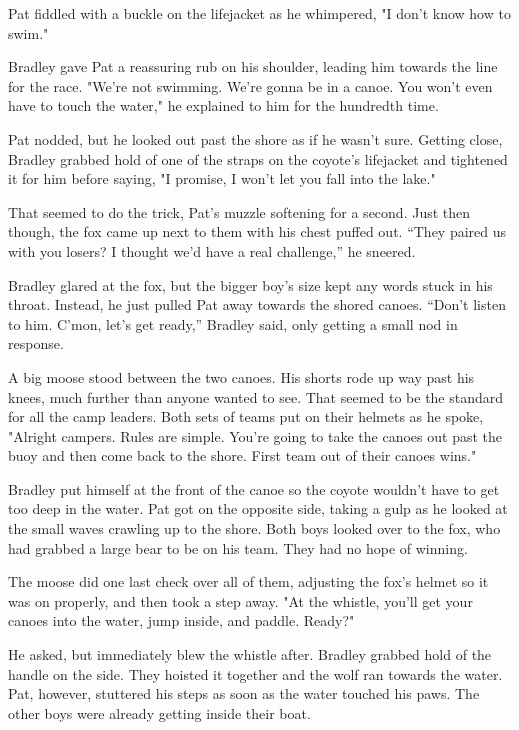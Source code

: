 Pat fiddled with a buckle on the lifejacket as he whimpered, "I don't
know how to swim."

Bradley gave Pat a reassuring rub on his shoulder, leading him towards
the line for the race. "We're not swimming. We're gonna be in a canoe.
You won't even have to touch the water," he explained to him for the
hundredth time.

Pat nodded, but he looked out past the shore as if he wasn't sure.
Getting close, Bradley grabbed hold of one of the straps on the coyote's
lifejacket and tightened it for him before saying, "I promise, I won't
let you fall into the lake."

That seemed to do the trick, Pat's muzzle softening for a second. Just
then though, the fox came up next to them with his chest puffed out.
``They paired us with you losers? I thought we'd have a real challenge,''
he sneered.

Bradley glared at the fox, but the bigger boy's size kept any words
stuck in his throat. Instead, he just pulled Pat away towards the shored
canoes. ``Don't listen to him. C'mon, let's get ready,'' Bradley said,
only getting a small nod in response.

A big moose stood between the two canoes. His shorts rode up way past
his knees, much further than anyone wanted to see. That seemed to be the
standard for all the camp leaders. Both sets of teams put on their
helmets as he spoke, "Alright campers. Rules are simple. You're going to
take the canoes out past the buoy and then come back to the shore. First
team out of their canoes wins."

Bradley put himself at the front of the canoe so the coyote wouldn't
have to get too deep in the water. Pat got on the opposite side, taking
a gulp as he looked at the small waves crawling up to the shore. Both
boys looked over to the fox, who had grabbed a large bear to be on his
team. They had no hope of winning.

The moose did one last check over all of them, adjusting the fox's
helmet so it was on properly, and then took a step away. "At the
whistle, you'll get your canoes into the water, jump inside, and paddle.
Ready?"

He asked, but immediately blew the whistle after. Bradley grabbed hold
of the handle on the side. They hoisted it together and the wolf ran
towards the water. Pat, however, stuttered his steps as soon as the
water touched his paws. The other boys were already getting inside their
boat.

